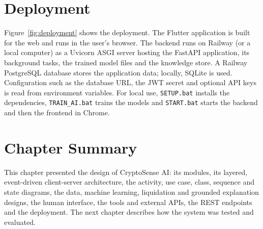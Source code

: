 \section{Deployment}
Figure~\ref{fig:deployment} shows the deployment. The Flutter application is built for the web and runs in the user's browser. The backend runs on Railway (or a local computer) as a Uvicorn ASGI server hosting the FastAPI application, its background tasks, the trained model files and the knowledge store. A Railway PostgreSQL database stores the application data; locally, SQLite is used. Configuration such as the database URL, the JWT secret and optional API keys is read from environment variables. For local use, \texttt{SETUP.bat} installs the dependencies, \texttt{TRAIN\_AI.bat} trains the models and \texttt{START.bat} starts the backend and then the frontend in Chrome.


\section{Chapter Summary}
This chapter presented the design of CryptoSense AI: its modules, its layered, event-driven client-server architecture, the activity, use case, class, sequence and state diagrams, the data, machine learning, liquidation and grounded explanation designs, the human interface, the tools and external APIs, the REST endpoints and the deployment. The next chapter describes how the system was tested and evaluated.

